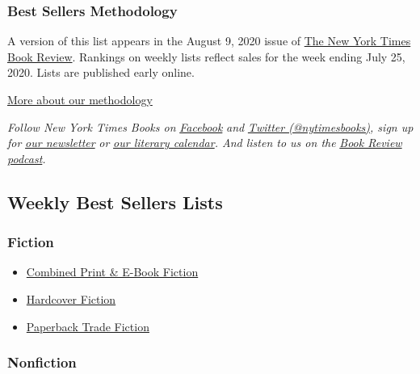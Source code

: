 \hypertarget{best-sellers-methodology}{%
\subsubsection{Best Sellers
Methodology}\label{best-sellers-methodology}}

A version of this list appears in the August 9, 2020 issue of
\href{http://www.nytimes3xbfgragh.onion/section/books/review}{The New
York Times Book Review}. Rankings on weekly lists reflect sales for the
week ending July 25, 2020. Lists are published early online.

\href{/books/best-sellers/methodology/}{More about our methodology}

\emph{Follow New York Times Books on}
\href{https://www.facebookcorewwwi.onion/nytbooks/}{\emph{Facebook}}
\emph{and} \href{https://twitter.com/nytimesbooks}{\emph{Twitter
(@nytimesbooks)}}\emph{, sign up for}
\href{https://www.nytimes3xbfgragh.onion/newsletters/books-review}{\emph{our
newsletter}} \emph{or}
\href{https://www.nytimes3xbfgragh.onion/interactive/2017/books/books-calendar.html}{\emph{our
literary calendar}}\emph{. And listen to us on the}
\href{https://www.nytimes3xbfgragh.onion/column/book-review-podcast}{\emph{Book
Review podcast}}\emph{.}

\hypertarget{weekly-best-sellers-lists}{%
\subsection{Weekly Best Sellers Lists}\label{weekly-best-sellers-lists}}

\hypertarget{fiction}{%
\subsubsection{Fiction}\label{fiction}}

\begin{itemize}
\tightlist
\item
  \href{/books/best-sellers/combined-print-and-e-book-fiction/}{Combined
  Print \& E-Book Fiction}
\item
  \href{/books/best-sellers/hardcover-fiction/}{Hardcover Fiction}
\item
  \href{/books/best-sellers/trade-fiction-paperback/}{Paperback Trade
  Fiction}
\end{itemize}

\hypertarget{nonfiction}{%
\subsubsection{Nonfiction}\label{nonfiction}}

